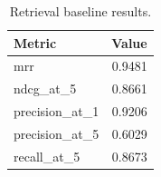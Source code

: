 \begin{table}[t]
\centering
\caption{Retrieval baseline results.}
\begin{tabular}{lr}
\toprule
Metric & Value \\
\midrule
mrr & 0.9481 \\
ndcg\_at\_5 & 0.8661 \\
precision\_at\_1 & 0.9206 \\
precision\_at\_5 & 0.6029 \\
recall\_at\_5 & 0.8673 \\
\bottomrule
\end{tabular}
\end{table}
